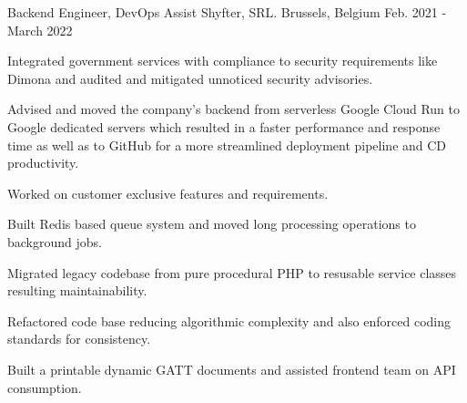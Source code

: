 \begin{cventries}
  \cventry
    {Backend Engineer, DevOps Assist} %
    {Shyfter, SRL.} %
    {Brussels, Belgium} %
    {Feb. 2021 - March 2022} %
    {
      \begin{cvitems} %
        \item {Integrated government services with compliance to security requirements like Dimona and audited and mitigated unnoticed security advisories.}
        \item {Advised and moved the company's backend from serverless Google Cloud Run to Google dedicated servers which resulted in a faster performance and response time as well as to GitHub for a more streamlined deployment pipeline and CD productivity.}
        \item {Worked on customer exclusive features and requirements.}
        \item {Built Redis based queue system and moved long processing operations to background jobs.}
        \item {Migrated legacy codebase from pure procedural PHP to resusable service classes resulting maintainability.}
        \item {Refactored code base reducing algorithmic complexity and also enforced coding standards for consistency.}
        \item {Built a printable dynamic GATT documents and assisted frontend team on API consumption.}
      \end{cvitems}
    }


\end{cventries}
